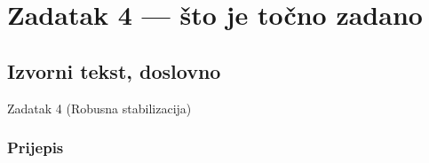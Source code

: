 \chapter{Zadatak 4 --- što je točno zadano}
\label{ch:z4-zadatak}

\section{Izvorni tekst, doslovno}
\label{sec:z4-izvorni}

\begin{zadatak}{Zadatak 4 (Robusna stabilizacija)}
\end{zadatak}

\subsection{Prijepis}

